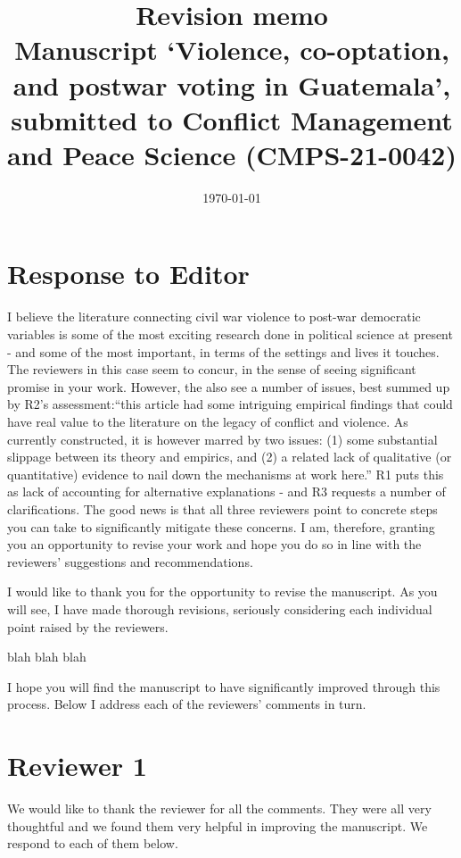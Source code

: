 \documentclass[12pt, a4paper, notitlepage]{article}
\title{\Large \textbf{Revision memo}\\{\large Manuscript `Violence, co-optation, and postwar voting in Guatemala', submitted to Conflict Management and Peace Science (CMPS-21-0042)}}
\date{\today}
\begin{document}
\maketitle

\section*{Response to Editor}

\begin{displayquote}
I believe the literature connecting civil war violence to post-war democratic variables is some of the most exciting research done in political science at present - and some of the most important, in terms of the settings and lives it touches.  The reviewers in this case seem to concur, in the sense of seeing significant promise in your work.  However, the also see a number of issues, best summed up by R2's assessment:``this article had some intriguing empirical findings that could have real value to the literature on the legacy of conflict and violence. As currently constructed, it is however marred by two issues: (1) some substantial slippage between its theory and empirics, and (2) a related lack of qualitative (or quantitative) evidence to nail down the mechanisms at work here.'' R1 puts this as lack of accounting for alternative explanations - and R3 requests a number of clarifications.  The good news is that all three reviewers point to concrete steps you can take to significantly mitigate these concerns.  I am, therefore, granting you an opportunity to revise your work and hope you do so in line with the reviewers' suggestions and recommendations.
\end{displayquote}

I would like to thank you for the opportunity to revise the manuscript. As you will see, I have made thorough revisions, seriously considering each individual point raised by the reviewers.

blah blah blah

I hope you will find the manuscript to have significantly improved through this process.
Below I address each of the reviewers' comments in turn.

\newpage
\section*{Reviewer 1}

\textbf{{\color{red}{CHANGE }}} We would like to thank the reviewer for all the comments. They were all very thoughtful and we found them very helpful in improving the manuscript. We respond to each of them below.
\end{document}
